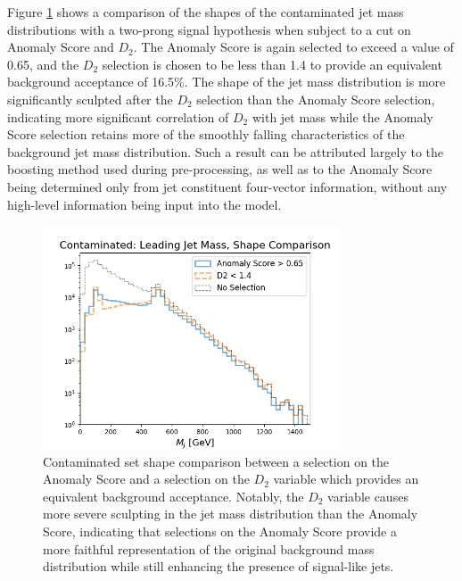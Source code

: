\documentclass[12pt, a4paper]{article}
\begin{document}
Figure \ref{fig:d2_comp} shows a comparison of the shapes of the contaminated jet mass distributions with a two-prong signal hypothesis when subject to a cut on Anomaly Score and $D_2$. The Anomaly Score is again selected to exceed a value of 0.65, and the $D_2$ selection is chosen to be less than 1.4 to provide an equivalent background acceptance of 16.5\%. The shape of the jet mass distribution is more significantly sculpted after the $D_2$ selection than the Anomaly Score selection, indicating more significant correlation of $D_2$ with jet mass while the Anomaly Score selection retains more of the smoothly falling characteristics of the background jet mass distribution. Such a result can be attributed largely to the boosting method used during pre-processing, as well as to the Anomaly Score being determined only from jet constituent four-vector information, without any high-level information being input into the model. 

\begin{figure}[H]
	\begin{center}
		\includegraphics[width=250pt]{imgs/2Prong_Contaminated_10p0_J_Mass_EventScore0p65_Multi_D2Comp_SaveForPaper.png}
	\end{center}
	\caption{Contaminated set shape comparison between a selection on the Anomaly Score and a selection on the $D_2$ variable which provides an equivalent background acceptance. Notably, the $D_2$ variable causes more severe sculpting in the jet mass distribution than the Anomaly Score, indicating that selections on the Anomaly Score provide a more faithful representation of the original background mass distribution while still enhancing the presence of signal-like jets.}
	\label{fig:d2_comp}
\end{figure}
\end{document}
